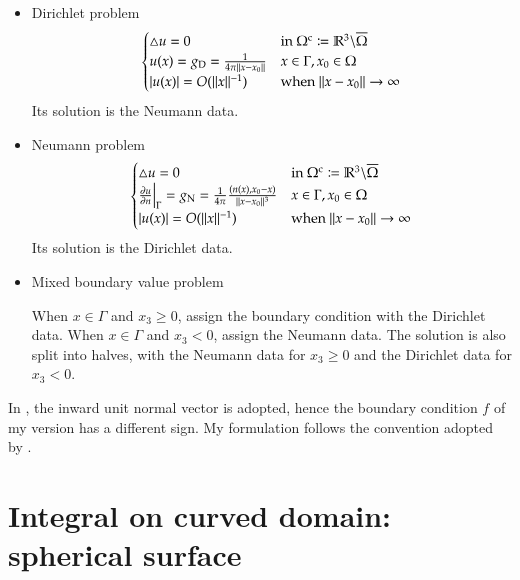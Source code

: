 \documentclass[11pt, a4paper]{book}
\begin{document}
\begin{itemize}
\item Dirichlet problem
  \begin{equation}
    \begin{cases}
      \triangle u = 0 & \text{in $\Omega^{\rm c}\coloneqq\mathbb{R}^3\backslash\overline{\Omega}$} \\
      u(x) = g_{\rm D} = \frac{1}{4\pi\lVert x-x_0\rVert} & x\in\Gamma, x_0\in\Omega \\
      \lvert u(x)\rvert = O(\lVert x\rVert^{-1}) & \text{when $\lVert x-x_0\rVert\rightarrow\infty$}
    \end{cases}
  \end{equation}
  Its solution is the Neumann data.
\item Neumann problem
  \begin{equation}
    \begin{cases}
      \triangle u = 0 & \text{in $\Omega^{\rm c}\coloneqq\mathbb{R}^3\backslash\overline{\Omega}$} \\
      \frac{\partial u}{\partial n}\Big\vert_{\Gamma} = g_{\rm N} = \frac{1}{4\pi}\frac{(n(x),
        x_0-x)}{\lVert x-x_0\rVert^3} & x\in\Gamma, x_0\in\Omega \\
      \lvert u(x)\rvert = O(\lVert x\rVert^{-1}) & \text{when $\lVert x-x_0\rVert\rightarrow\infty$}
    \end{cases}
  \end{equation}
  Its solution is the Dirichlet data.
\item Mixed boundary value problem

  When $x\in\Gamma$ and $x_3\geq 0$, assign the boundary condition with the Dirichlet data.
  When $x\in\Gamma$ and $x_3<0$, assign the Neumann data. The solution is also split into
  halves, with the Neumann data for $x_3\geq 0$ and the Dirichlet data for $x_3<0$.
\end{itemize}

\begin{mycomment}
  In \citep{ErichsenEfficient1998}, the inward unit normal vector is adopted, hence the
  boundary condition $f$ of my version has a different sign. My formulation follows the
  convention adopted by \citep{SteinbachNumerical2007}.
\end{mycomment}

\section{Integral on curved domain: spherical surface}
\end{document}
